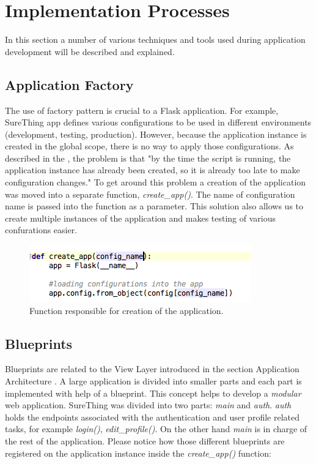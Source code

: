 \section{Implementation Processes}
In this section a number of  various techniques and tools used during application development will be described and explained. 

\subsection{Application Factory}
The use of factory pattern is crucial to a Flask application. For example, SureThing app defines various configurations to be used in different environments (development, testing, production). However, because the application instance is created in the global scope, there is no way to apply those configurations. As described in the \cite{book:Grindberg2014FlaskWebDevelopment}, the problem is that "by the time the script is running, the application instance has already been created, so it is already too late to make configuration changes." To get around this problem a creation of the application was moved into a separate function, \emph{create\_app()}. The name of configuration name is passed into the function as a parameter. This solution also allows us to create multiple instances of the application and makes testing of various confurations easier.\cite{documentation:FlaskApplicationFactories} 

\begin{figure}[H]
	\begin{center}
		\includegraphics[width=.40\linewidth,natwidth=610,natheight=642]{impl/images/createApp}
		\caption{Function responsible for creation of the application.} \label{fig:using:createApp}
	\end{center}
\end{figure}

\subsection{Blueprints}
Blueprints are related to the View Layer introduced in the section Application Architecture \cite{sec:applicationarchitecture}. A large application is divided into smaller parts and each part is implemented with help of a blueprint. This concept helps to develop a \emph{modular} web application. SureThing was divided into two parts: \emph{main} and \emph{auth}. \emph{auth} holds the endpoints associated with the authentication and user profile related tasks, for example \emph{login()}, \emph{edit\_profile()}. On the other hand \emph{main} is in charge of the rest of the application. Please notice how those different blueprints are registered on the application instance inside the \emph{create\_app()} function:

